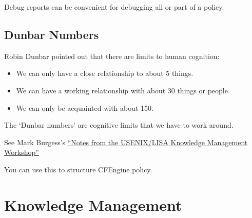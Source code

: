 Debug reports can be convenient for debugging all or part of a policy.

\begin{codelisting}
\end{codelisting}





\section{Dunbar Numbers}

Robin Dunbar pointed out that there are limits to human cognition:

\begin{itemize}
\item{} We can only have a close relationship to about 5 things.
\item{} We can have a working relationship with about 30 things or people.
\item{} We can only be acquainted with about 150.
\end{itemize}

The `Dunbar numbers' are cognitive limits that we have to work around.

See Mark Burgess's \href{http://markburgess.org/blog_km.html}{``Notes from the USENIX/LISA Knowledge Management Workshop''}

You can use this to structure CFEngine policy.





\chapter{Knowledge Management}